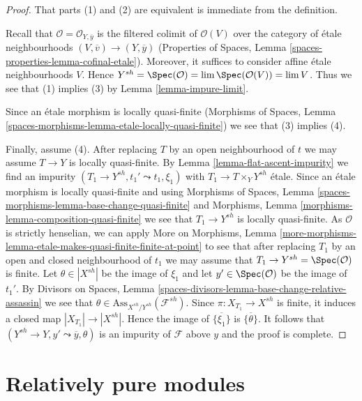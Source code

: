 \begin{proof}
That parts (1) and (2) are equivalent is immediate from the definition.

\medskip\noindent
Recall that $\mathcal{O} = \mathcal{O}_{Y, \overline{y}}$
is the filtered colimit of $\mathcal{O}(V)$ over the category
of \'etale neighbourhoods $(V, \overline{v}) \to (Y, \overline{y})$
(Properties of Spaces, Lemma \ref{spaces-properties-lemma-cofinal-etale}).
Moreover, it suffices to consider affine \'etale neighbourhoods $V$.
Hence $Y^{sh} = \Spec(\mathcal{O}) = \lim \Spec(\mathcal{O}(V)) = \lim V$.
Thus we see that (1) implies (3) by Lemma \ref{lemma-impure-limit}.

\medskip\noindent
Since an \'etale morphism is locally quasi-finite
(Morphisms of Spaces, Lemma
\ref{spaces-morphisms-lemma-etale-locally-quasi-finite})
we see that (3) implies (4).

\medskip\noindent
Finally, assume (4). After replacing $T$ by an open neighbourhood of $t$
we may assume $T \to Y$ is locally quasi-finite.
By Lemma \ref{lemma-flat-ascent-impurity}
we find an impurity
$(T_1 \to Y^{sh}, t_1' \leadsto t_1, \xi_1)$
with $T_1 \to T \times_Y Y^{sh}$
\'etale. Since an \'etale morphism is locally quasi-finite
and using Morphisms of Spaces, Lemma
\ref{spaces-morphisms-lemma-base-change-quasi-finite} and
Morphisms, Lemma \ref{morphisms-lemma-composition-quasi-finite}
we see that $T_1 \to Y^{sh}$ is locally quasi-finite.
As $\mathcal{O}$ is strictly henselian, we can apply More on Morphisms, Lemma
\ref{more-morphisms-lemma-etale-makes-quasi-finite-finite-at-point}
to see that after replacing $T_1$ by an open and closed neighbourhood
of $t_1$ we may assume that $T_1 \to Y^{sh} = \Spec(\mathcal{O})$
is finite. Let $\theta \in |X^{sh}|$ be the image of
$\xi_1$ and let $y' \in \Spec(\mathcal{O})$ be the image
of $t_1'$. By Divisors on Spaces, Lemma
\ref{spaces-divisors-lemma-base-change-relative-assassin}
we see that $\theta \in \text{Ass}_{X^{sh}/Y^{sh}}(\mathcal{F}^{sh})$.
Since $\pi : X_{T_1} \to X^{sh}$
is finite, it induces a closed map $|X_{T_1}| \to |X^{sh}|$.
Hence the image of $\overline{\{\xi_1\}}$ is $\overline{\{\theta\}}$.
It follows that $(Y^{sh} \to Y, y' \leadsto \overline{y}, \theta)$
is an impurity of $\mathcal{F}$ above $y$ and the proof is complete.
\end{proof}








\section{Relatively pure modules}
\label{section-pure}

